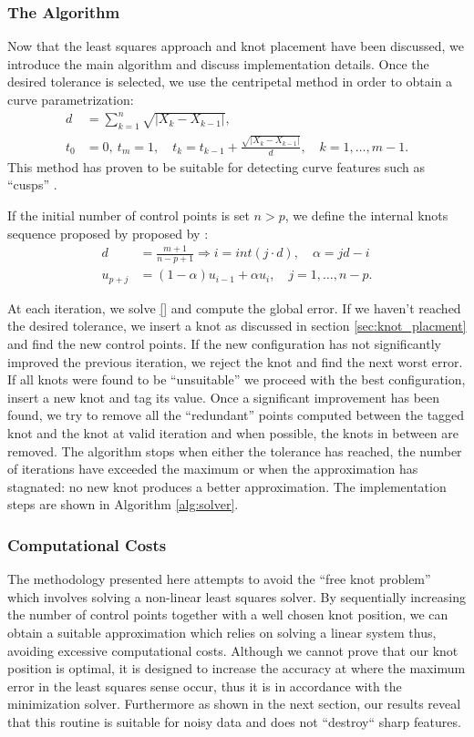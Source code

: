 \subsubsection{The Algorithm}
Now that the least squares approach and knot placement have been discussed, we introduce the main algorithm and discuss implementation 
details. Once the desired tolerance is selected, we use the centripetal method in order to obtain a curve parametrization: 
\begin{align}
 d &= \sum_{k=1}^n \sqrt {| X_k-X_{k-1}|},\\
 t_0 &=0,\ t_m=1,\quad t_k = t_{k-1} + \frac{\sqrt{|X_k-X_{k-1}|}}{d},\quad k = 1,\ldots, m-1.
 \end{align}
This method has proven to be suitable for detecting curve features such as ``cusps'' \cite{}. 
\begin{note}
 If the initial number of control points is set $n > p$, we define the internal knots sequence proposed by proposed by \cite{}: 
  \begin{align}
  d &= \frac{m+1}{n-p+1} \Rightarrow i = int(j\cdot d),\quad \alpha = jd -i\\
  u_{p+j} &= (1-\alpha)u_{i-1} + \alpha u_i,\quad j = 1,\ldots,n-p.
 \end{align}
\end{note}

At each iteration, we solve \eqref{} and compute the global error. If we haven't reached the desired tolerance, 
we insert a knot as discussed in section \ref{sec:knot_placment} and find the new control points. If the 
new configuration has not significantly improved the previous iteration, we reject the knot and find the next worst error. 
 If all knots were found to be ``unsuitable'' we proceed with the best configuration, insert a new knot and tag its 
 value. Once a significant improvement has been found, we try to remove all the ``redundant'' points computed between the tagged knot and the 
 knot at valid iteration and when possible, the knots in between are removed. The algorithm stops when either the tolerance has reached, 
 the number of iterations have exceeded the maximum or when the approximation has stagnated: no new knot 
 produces a better approximation. The implementation steps are shown in Algorithm \ref{alg:solver}. 


\subsubsection{Computational Costs}
The methodology presented here attempts to avoid the ``free knot problem'' which involves solving a non-linear 
least squares solver. By sequentially increasing the number of control points together with a well chosen knot 
position, we can obtain a suitable approximation which relies on solving a linear system thus, avoiding excessive 
computational costs. Although we cannot prove that our knot position is optimal, it is designed to increase the accuracy 
 at where the maximum error in the least squares sense occur,
  thus it is in accordance with the minimization solver. 
  Furthermore as shown in the next section, our results reveal that this routine is suitable for 
   noisy data and does not ``destroy`` sharp features. 
   
